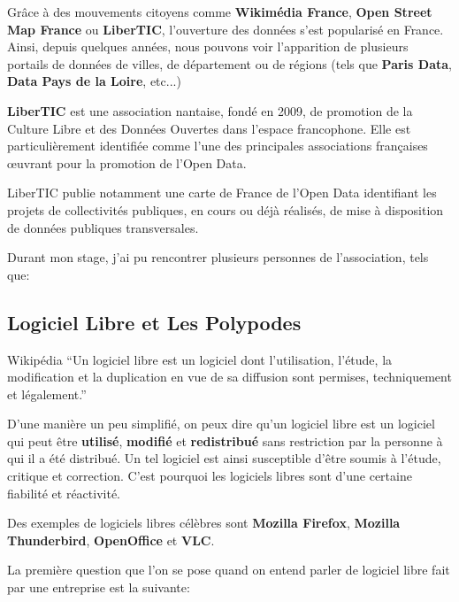 Grâce à des mouvements citoyens comme \textbf{Wikimédia France}, \textbf{Open Street Map France} ou \textbf{LiberTIC}, l'ouverture des données s'est popularisé en France. Ainsi, depuis quelques années, nous pouvons voir l'apparition de plusieurs portails de données de villes, de département ou de régions (tels que \textbf{Paris Data}, \textbf{Data Pays de la Loire}, etc...)

\textbf{LiberTIC} est une association nantaise, fondé en 2009, de promotion de la Culture Libre et des Données Ouvertes dans l'espace francophone. Elle est particulièrement identifiée comme l'une des principales associations françaises œuvrant pour la promotion de l'Open Data.

LiberTIC publie notamment une carte de France de l'Open Data identifiant les projets de collectivités publiques, en cours ou déjà réalisés, de mise à disposition de données publiques transversales.

\vspace{1cm}

Durant mon stage, j'ai pu rencontrer plusieurs personnes de l'association, tels que:


\subsection{Logiciel Libre et Les Polypodes}

\begin{aquote}{Wikipédia}
``Un logiciel libre est un logiciel dont l'utilisation, l'étude, la modification et la duplication en vue de sa diffusion sont permises, techniquement et légalement.''
\end{aquote}

D'une manière un peu simplifié, on peux dire qu'un logiciel libre est un logiciel qui peut être \textbf{utilisé}, \textbf{modifié} et \textbf{redistribué} sans restriction par la personne à qui il a été distribué. Un tel logiciel est ainsi susceptible d'être soumis à l'étude, critique et correction. C'est pourquoi les logiciels libres sont d'une certaine fiabilité et réactivité.

Des exemples de logiciels libres célèbres sont \textbf{Mozilla Firefox}, \textbf{Mozilla Thunderbird}, \textbf{OpenOffice} et \textbf{VLC}.

\vspace{1cm}

La première question que l'on se pose quand on entend parler de logiciel libre fait par une entreprise est la suivante:

